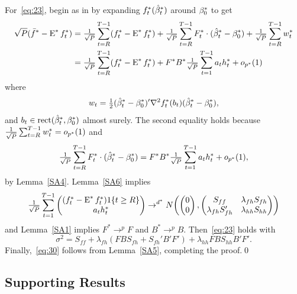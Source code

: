 \documentclass[12pt,fleqn]{article}
\begin{document}
For~\eqref{eq:23}, begin as in \citet{Wes:96} by expanding
$f_t^{*}(\hat \beta_t^*)$ around $\beta_0^*$ to get
  \begin{align*}
    \sqrt{P} (\bar f^* - \operatorname{E}^* f_t^*)
    &= \tfrac{1}{\sqrt{P}} \sum_{t=R}^{T-1} (f_t^{*} - \operatorname{E}^* f_t^*)
     + \tfrac{1}{\sqrt{P}} \sum_{t=R}^{T-1} F_t^* \cdot (\hat \beta_t^* - \beta_0^*)
     + \tfrac{1}{\sqrt{P}} \sum_{t=R}^{T-1} w_t^* \\
    &= \tfrac{1}{\sqrt{P}} \sum_{t=R}^{T-1} (f_t^{*} - \operatorname{E}^* f_t^*)
     + F^* B^* \tfrac{1}{\sqrt{P}} \sum_{t=1}^{T-1} a_t h_t^* + o_{p^*}(1)
  \end{align*}
  where
  \begin{equation*}
    w_{t} = \tfrac12 (\hat \beta_t^* - \beta_0^*)' \nabla^2 f_{t}^*(b_{t}) (\hat \beta_t^* - \beta_0^*),
  \end{equation*}
  and $b_t \in \operatorname{rect}(\hat \beta_t^*, \beta_0^*)$ almost surely. The second
  equality holds because $\tfrac{1}{\sqrt{P}} \sum_{t=R}^{T-1} w_t^* = o_{p^*}(1)$ and
  \begin{equation*}
    \tfrac{1}{\sqrt{P}} \sum_{t=R}^{T-1} F_t^* \cdot (\hat \beta_t^* - \beta_0^*)
    = F^* B^* \tfrac{1}{\sqrt{P}} \sum_{t=1}^{T-1} a_t h_t^* + o_{p^*}(1),
  \end{equation*}
  by Lemma~\ref{SA4}. Lemma~\ref{SA6} implies
  \begin{equation}\label{eq:19}
    \tfrac{1}{\sqrt{P}} \sum_{t=1}^{T-1} \begin{pmatrix}
      (f_t^* - \operatorname{E}^* f_t^*) 1\{t \geq R\} \\ a_t h_t^*
    \end{pmatrix} \to^{d^*}
    N\!
    \begin{pmatrix}
      \begin{pmatrix} 0 \\ 0 \end{pmatrix},
      \begin{pmatrix}
        S_{ff} & \lambda_{fh} S_{fh} \\
        \lambda_{fh} S_{fh}' &  \lambda_{hh} S_{hh}
      \end{pmatrix}
    \end{pmatrix}
  \end{equation}
  and Lemma~\ref{SA1} implies $F^* \to^p F$ and $B^* \to^p
  B$. Then~\eqref{eq:23} holds with
  \begin{equation*}
    \sigma^2 = S_{ff} + \lambda_{fh} (F B S_{fh} + S_{fh}' B'F') + \lambda_{hh} F B S_{hh} B' F'.
  \end{equation*}
  Finally,~\eqref{eq:30} follows from Lemma~\ref{SA5}, completing the
  proof.\qed

\subsection{Supporting Results}
\end{document}
